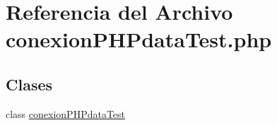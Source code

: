 \hypertarget{conexionPHPdataTest_8php}{\section{Referencia del Archivo conexion\-P\-H\-Pdata\-Test.\-php}
\label{conexionPHPdataTest_8php}
}
\subsection*{Clases}
\begin{DoxyCompactItemize}
\item 
class \hyperlink{classconexionPHPdataTest}{conexion\-P\-H\-Pdata\-Test}
\end{DoxyCompactItemize}
